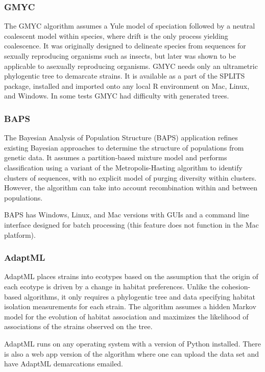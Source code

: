 \subsubsection*{GMYC~\cite{barraclough2009inferring}}
The GMYC algorithm assumes a Yule model of speciation followed by a neutral coalescent model within species, where drift is the only process yielding coalescence.
It was originally designed to delineate species from sequences for sexually reproducing organisms such as insects, but later was shown to be applicable to asexually reproducing organisms.
GMYC needs only an ultrametric phylogentic tree to demarcate strains.
It is available as a part of the SPLITS package, installed and imported onto any local R environment on Mac, Linux, and Windows.
In some tests GMYC had difficulty with generated trees.

\subsubsection*{BAPS~\cite{corander2007bayesian}}
The Bayesian Analysis of Population Structure (BAPS) application refines existing Bayesian approaches to determine the structure of populations from genetic data.
It assumes a partition-based mixture model and performs classification using a variant of the Metropolis-Hasting algorithm to identify clusters of sequences, with no explicit model of purging diversity within clusters.
However, the algorithm can take into account recombination within and between populations.

BAPS has Windows, Linux, and Mac versions with GUIs and a command line interface designed for batch processing (this feature does not function in the Mac platform).

\subsubsection*{AdaptML~\cite{hunt2008resource}}
AdaptML places strains into ecotypes based on the assumption that the origin of each ecotype is driven by a change in habitat preferences.
Unlike the cohesion-based algorithms, it only requires a phylogentic tree and data specifying habitat isolation measurements for each strain.
The algorithm assumes a hidden Markov model for the evolution of habitat association and maximizes the likelihood of associations of the strains observed on the tree.

AdaptML runs on any operating system with a  version of Python installed. There is also a web app version of the algorithm where one can upload the data set and have AdaptML demarcations emailed.

